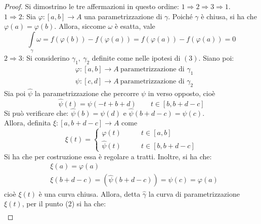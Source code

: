 \begin{proof}
    Si dimostrino le tre affermazioni in questo ordine: $1 \Rightarrow 2 \Rightarrow 3 \Rightarrow 1$.\\
    $1 \Rightarrow 2$: Sia $\varphi: [a,b] \to A$ una parametrizzazione di $\gamma$. Poiché $\gamma$ è chiusa, si ha che $\varphi(a)=\varphi(b)$. Allora, siccome $\omega$ è esatta, vale 
    \begin{equation}
        \int\limits_{\gamma}{\omega} = f(\varphi(b))- f(\varphi(a)) = f(\varphi(a))-f(\varphi(a))=0
    \end{equation}
    $2 \Rightarrow 3$: Si considerino $\gamma_1,\ \gamma_2$ definite come nelle ipotesi di $(3)$. Siano poi:
    \begin{equation}
        \begin{aligned}
            &\varphi: [a,b] \to A \ \text{parametrizzazione di } \gamma_1\\
            &\psi:[c, d] \to A \ \text{parametrizzazione di } \gamma_2
        \end{aligned}
    \end{equation}
    Sia poi $\hat{\psi}$ la parametrizzazione che percorre $\psi$ in verso opposto, cioè
    \begin{equation}
        \hat{\psi}(t)= \psi(-t+b+d) \qquad t \in [b, b+d-c]
    \end{equation}
Si può verificare che: $\hat{\psi}(b)= \psi(d)$ e $\hat{\psi}(b+d-c)=\psi(c)$.\\
Allora, definita $\xi: [a, b+d-c] \to A$ come
\begin{equation}
    \xi(t)= \begin{cases}
        \varphi(t) \qquad & t \in [a,b]\\
        \hat{\psi}(t) \qquad & t \in [b, b+d-c]
    \end{cases}
\end{equation}
Si ha che per costruzione essa è regolare a tratti. Inoltre, si ha che:
\begin{equation}
\begin{aligned}
    &\xi(a)= \varphi(a)\\
    &\xi(b+d-c)= (\hat{\psi}(b+d-c))=\psi(c)=\varphi(a)
\end{aligned}
\end{equation}
cioè $\xi(t)$ è una curva chiusa. Allora, detta $\hat{\gamma}$ la curva di parametrizzazione $\xi(t)$, per il punto (2) si ha che:
\begin{equation}
\begin{aligned}

\end{aligned}
\end{equation}
\end{proof}
